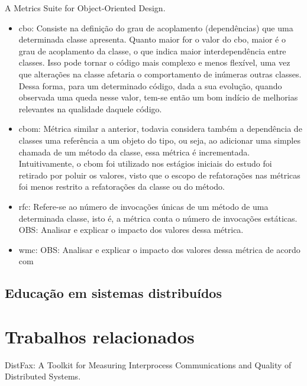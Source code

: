 A Metrics Suite for Object-Oriented Design.
\cite{MetricsSuite}

\begin{itemize}
    \item \gls{cbo}: Consiste na definição do grau de acoplamento (dependências) que uma determinada classe apresenta. Quanto maior for o valor do \gls{cbo}, maior é o grau de acoplamento da classe, o que indica maior interdependência entre classes. Isso pode tornar o código mais complexo e menos flexível, uma vez que alterações na classe afetaria o comportamento de inúmeras outras classes. Dessa forma, para um determinado código, dada a sua evolução, quando observada uma queda nesse valor, tem-se então um bom indício de melhorias relevantes na qualidade daquele código.
    \item \gls{cbom}: Métrica similar a anterior, todavia considera também a dependência de classes uma referência a um objeto do tipo, ou seja, ao adicionar uma simples chamada de um método da classe, essa métrica é incrementada. Intuitivamente, o \gls{cbom} foi utilizado nos estágios iniciais do estudo foi retirado por poluir os valores, visto que o escopo de refatorações nas métricas foi menos restrito a refatorações da classe ou do método.
    \item \gls{rfc}: Refere-se ao número de invocações únicas de um método de uma determinada classe, isto é, a métrica conta o número de invocações estáticas. 
    OBS: Analisar e explicar o impacto dos valores dessa métrica.
    \item \gls{wmc}: OBS: Analisar e explicar o impacto dos valores dessa métrica de acordo com \cite{MetricsSuite}
\end{itemize}

\subsection{Educação em sistemas distribuídos}


\section{Trabalhos relacionados}
\label{section:related-work}

DistFax: A Toolkit for Measuring Interprocess Communications and Quality of Distributed Systems.
\cite{DistFax}

